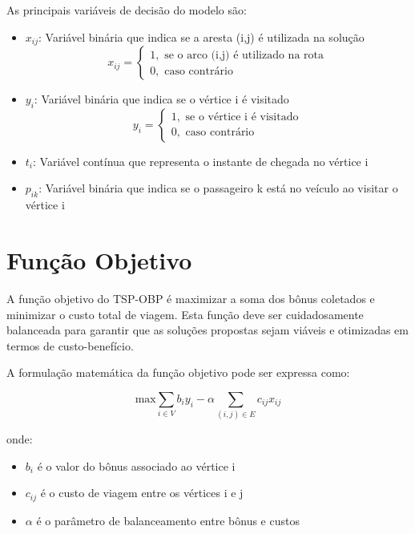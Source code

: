 \documentclass[12pt, a4paper]{report}
\begin{document}
As principais variáveis de decisão do modelo são:

\begin{itemize}
    \item $x_{ij}$: Variável binária que indica se a aresta (i,j) é utilizada na solução
    \begin{equation}
        x_{ij} = \begin{cases}
            1, \text{ se o arco (i,j) é utilizado na rota} \\
            0, \text{ caso contrário}
        \end{cases}
    \end{equation}

    \item $y_i$: Variável binária que indica se o vértice i é visitado
    \begin{equation}
        y_i = \begin{cases}
            1, \text{ se o vértice i é visitado} \\
            0, \text{ caso contrário}
        \end{cases}
    \end{equation}

    \item $t_i$: Variável contínua que representa o instante de chegada no vértice i

    \item $p_{ik}$: Variável binária que indica se o passageiro k está no veículo ao visitar o vértice i
\end{itemize}

\section{Função Objetivo}
A função objetivo do TSP-OBP é maximizar a soma dos bônus coletados e minimizar o custo total de viagem. Esta função deve ser cuidadosamente balanceada para garantir que as soluções propostas sejam viáveis e otimizadas em termos de custo-benefício.

A formulação matemática da função objetivo pode ser expressa como:

\begin{equation}
    \text{max} \sum_{i \in V} b_i y_i - \alpha \sum_{(i,j) \in E} c_{ij} x_{ij}
\end{equation}

onde:
\begin{itemize}
    \item $b_i$ é o valor do bônus associado ao vértice i
    \item $c_{ij}$ é o custo de viagem entre os vértices i e j
    \item $\alpha$ é o parâmetro de balanceamento entre bônus e custos
\end{itemize}
\end{document}
